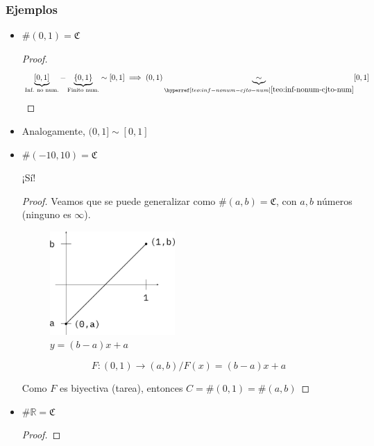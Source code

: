 \subsubsection{Ejemplos}
\begin{itemize}
    \item $\# (0,1) = \mathfrak{C}$

        \begin{proof}\phantom{.}

            \[ \underbrace{[0,1]}_{\text{Inf. no num.}} 
            - \underbrace{\{0,1\}}_{\text{Finito num.}} \sim [0,1] 
        \implies (0,1) 
        \underbrace{\sim}_{\fullref{teo:inf-nonum-cjto-num}}
        [0,1]\]
        \end{proof}

    \item Analogamente, $(0,1] \sim [0,1]$

    \item $\# (-10, 10) = \mathfrak{C}$

        ¡Sí!

        \begin{proof}\phantom{.}
            Veamos que se puede generalizar como $\# (a, b) = \mathfrak{C}$, 
            con $a, b$ números (ninguno es $\infty$).

        \begin{figure}[H]
            \centering
            \includegraphics[width=0.45\textwidth]{mapeo_0-1_a-b}
            \caption{$y = (b-a)x + a$}
        \end{figure} %

        \[ F: (0,1) \to (a,b) / F(x) = (b-a) x + a \]

        Como $F$ es biyectiva (tarea), entonces $C = \#(0,1) = \#(a,b)$

        \end{proof}

    \item $\# \mathbb{R} = \mathfrak{C}$
        \begin{proof}\phantom{.}
            

\end{proof}
\end{itemize}
